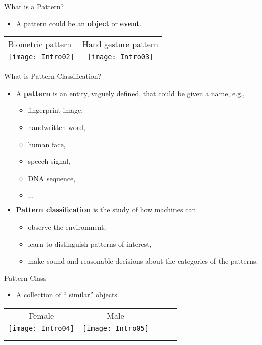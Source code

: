 \begin{frame}{What is a Pattern?}
\begin{itemize}
\item A pattern could be an \textbf{\color{mycolor2}object} or \textbf{\color{mycolor2}event}.
\end{itemize}
\begin{table}[]
\centering
\begin{tabular}{lc}
Biometric pattern & Hand gesture pattern  \\
\texttt{[image: Intro02]} & \texttt{[image: Intro03]} \\
\end{tabular}
\end{table}
\end{frame}

\begin{frame}{What is Pattern Classification?}
\begin{itemize}
\item A \textbf{\color{mycolor2}pattern} is an entity, vaguely defined, that could be given a name, e.g.,
\begin{itemize}
\item fingerprint image,
\item handwritten word,
\item human face,
\item speech signal,
\item DNA sequence,
\item $\ldots$
\end{itemize}
\item \textbf{\color{mycolor2}Pattern classification} is the study of how machines can
\begin{itemize}
\item observe the environment,
\item learn to distinguish patterns of interest,
\item make sound and reasonable decisions about the categories of the patterns.
\end{itemize} 
\end{itemize}
\end{frame}

\begin{frame}{Pattern Class}
\begin{itemize}
\item A collection of ``{\color{mycolor2} similar}'' objects.
\end{itemize}
\begin{table}[]
\centering
\begin{tabular}{c|clll}
Female & Male &  &  &  \\
\texttt{[image: Intro04]} & \texttt{[image: Intro05]} &  &  &  \\
  &   &  &  &  \\
  &   &  &  & 
\end{tabular}
\end{table}
\end{frame}

